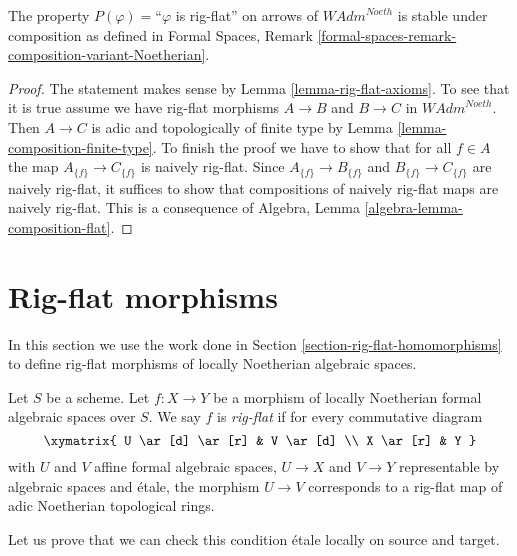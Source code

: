 \begin{lemma}
\label{lemma-composition-rig-flat-continuous}
The property $P(\varphi)=$``$\varphi$ is rig-flat''
on arrows of $\textit{WAdm}^{Noeth}$ is stable under composition
as defined in Formal Spaces, Remark
\ref{formal-spaces-remark-composition-variant-Noetherian}.
\end{lemma}

\begin{proof}
The statement makes sense by Lemma \ref{lemma-rig-flat-axioms}.
To see that it is true assume we have rig-flat morphisms
$A \to B$ and $B \to C$ in $\textit{WAdm}^{Noeth}$.
Then $A \to C$ is adic and topologically of finite type
by Lemma \ref{lemma-composition-finite-type}.
To finish the proof we have to show that for all $f \in A$ the map
$A_{\{f\}} \to C_{\{f\}}$ is naively rig-flat.
Since $A_{\{f\}} \to B_{\{f\}}$ and $B_{\{f\}} \to C_{\{f\}}$
are naively rig-flat, it suffices to show that
compositions of naively rig-flat maps are naively rig-flat.
This is a consequence of Algebra, Lemma \ref{algebra-lemma-composition-flat}.
\end{proof}











\section{Rig-flat morphisms}
\label{section-rig-flat-morphisms}

\noindent
In this section we use the work done in
Section \ref{section-rig-flat-homomorphisms}
to define rig-flat morphisms of locally Noetherian algebraic spaces.

\begin{definition}
\label{definition-rig-flat}
Let $S$ be a scheme. Let $f : X \to Y$ be a morphism of locally
Noetherian formal algebraic spaces over $S$. We say $f$ is
{\it rig-flat} if for every commutative diagram
$$
\xymatrix{
U \ar[d] \ar[r] & V \ar[d] \\
X \ar[r] & Y
}
$$
with $U$ and $V$ affine formal algebraic spaces, $U \to X$ and $V \to Y$
representable by algebraic spaces and \'etale, the morphism $U \to V$
corresponds to a rig-flat map of adic Noetherian topological rings.
\end{definition}

\noindent
Let us prove that we can check this condition \'etale locally on
source and target.

